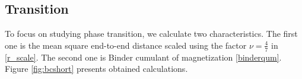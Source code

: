  



\subsection{Transition} \label{section:Transition}
To focus on studying phase transition, we calculate two characteristics. The first one is the mean square end-to-end distance scaled using the factor $\nu = \frac{4}{7}$ in \eqref{r_scale}. The second one is Binder cumulant of magnetization \eqref{binderqum}. Figure \ref{fig:bcshort}  presents obtained calculations. 

